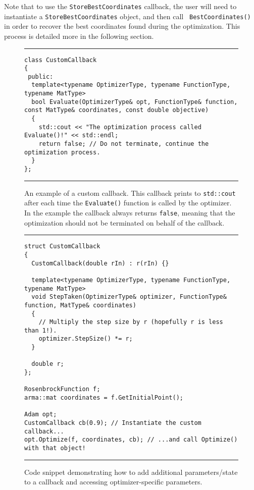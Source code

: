 Note that to use the {\tt StoreBestCoordinates} callback, the user will need to
instantiate a {\tt StoreBestCoordinates} object, and then call {\tt
BestCoordinates()} in order to recover the best coordinates found during the
optimization.  This process is detailed more in the following section.

\begin{figure}[t!]
\centering
\hrule
\vspace{1ex}
\begin{verbatim}
class CustomCallback
{
 public:
  template<typename OptimizerType, typename FunctionType, typename MatType>
  bool Evaluate(OptimizerType& opt, FunctionType& function, const MatType& coordinates, const double objective)
  {
    std::cout << "The optimization process called Evaluate()!" << std::endl;
    return false; // Do not terminate, continue the optimization process.
  }
};
\end{verbatim}
\hrule
\vspace*{-0.5em}
\caption
  {
  An example of a custom callback.  This callback prints to {\tt std::cout}
after each time the {\tt Evaluate()} function is called by the optimizer. In the example the
callback always returns {\tt false}, meaning that the optimization should not be
terminated on behalf of the callback.
  }
\label{fig:example_prog_callbacks_2}
\end{figure}

\begin{figure}[b!]
\centering
\hrule
\vspace{1ex}
\begin{verbatim}
struct CustomCallback
{
  CustomCallback(double rIn) : r(rIn) {}

  template<typename OptimizerType, typename FunctionType, typename MatType>
  void StepTaken(OptimizerType& optimizer, FunctionType& function, MatType& coordinates)
  {
    // Multiply the step size by r (hopefully r is less than 1!).
    optimizer.StepSize() *= r;
  }

  double r;
};

RosenbrockFunction f;
arma::mat coordinates = f.GetInitialPoint();

Adam opt;
CustomCallback cb(0.9); // Instantiate the custom callback...
opt.Optimize(f, coordinates, cb); // ...and call Optimize() with that object!
\end{verbatim}
\hrule
\vspace*{-0.5em}
\caption
  {
  Code snippet demonstrating how to add additional parameters/state to a
callback and accessing optimizer-specific parameters.
  }
\label{fig:example_prog_callbacks_parameter}
\end{figure}

